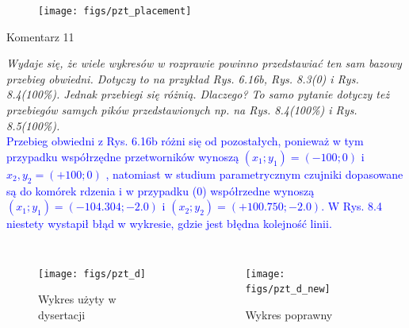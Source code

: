 \documentclass[10pt,aspectratio=169]{beamer} %
\begin{document}
\begin{frame}
	\begin{figure}
		\centering
		\texttt{[image: figs/pzt\_placement]}
	\end{figure}
\end{frame}
\begin{frame}[label=frame17]{Komentarz 11}\justifying

\textit{Wydaje się, że wiele wykresów w rozprawie powinno przedstawiać ten sam bazowy przebieg obwiedni. Dotyczy to na przykład Rys. 6.16b, Rys. 8.3(0) i Rys. 8.4(100\%). Jednak przebiegi się różnią. Dlaczego? To samo pytanie dotyczy też przebiegów samych pików przedstawionych np. na Rys. 8.4(100\%) i Rys. 8.5(100\%).}\\
\textcolor{blue}{Przebieg obwiedni z Rys. 6.16b różni się od pozostałych, ponieważ w tym przypadku współrzędne przetworników wynoszą \((x_1;y_1) = (-100;0) \) i \(x_2,y_2 = (+100;0)\) , natomiast w studium parametrycznym czujniki dopasowane są do komórek rdzenia i w przypadku (0) współrzedne wynoszą \((x_1;y_1) = (-104.304; -2.0)\) i \((x_2;y_2) = (+100.750; -2.0)\). W Rys. 8.4 niestety wystapił błąd w wykresie, gdzie jest błędna kolejność linii.}

\end{frame}

\begin{frame}
	\begin{columns}
		\begin{figure}
			\centering
			\caption{Wykres użyty w dysertacji}
			\texttt{[image: figs/pzt\_d]}
		\end{figure}
		\begin{figure}
			\centering
			\caption{Wykres poprawny}
			\texttt{[image: figs/pzt\_d\_new]}
		\end{figure}
	\end{columns}
\end{frame}
\end{document}
